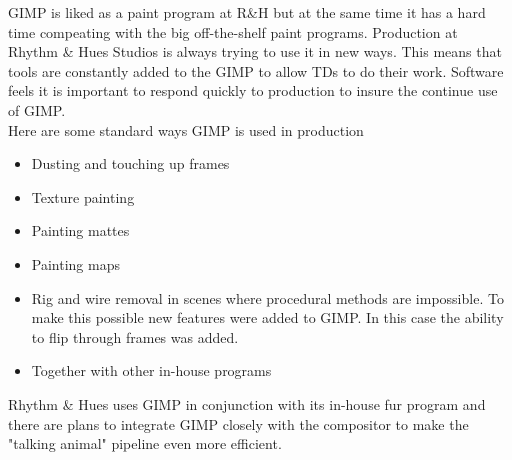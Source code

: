 GIMP is liked as a paint program at R\&H but at the same time it has a hard time compeating with the big off-the-shelf paint programs. Production at Rhythm \& Hues Studios is always trying to use it in new ways. This means that tools are constantly added to the GIMP to allow TDs to do their work. Software feels it is important to respond quickly to production to insure the continue use of GIMP.\\ 

Here are some standard ways GIMP is used in production 
\begin{itemize}
\item Dusting and touching up frames
\item Texture painting 
\item Painting mattes
\item Painting maps
\item Rig and wire removal in scenes where procedural methods are impossible. To make this possible new features were added to GIMP. In this case the ability to flip through frames was added. 
\item Together with other in-house programs
\end{itemize}

Rhythm \& Hues uses GIMP in conjunction with its in-house fur program and
there are plans to integrate GIMP closely with the compositor to make the
"talking animal" pipeline even more efficient.

 
